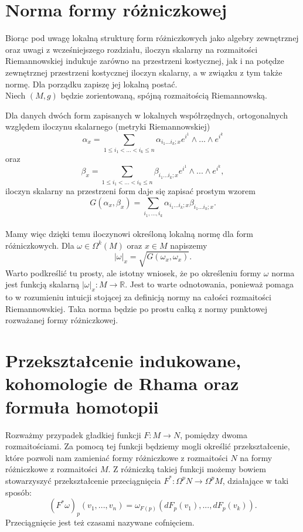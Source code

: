 \documentclass[licencjacka]{pracamgr}
\theoremstyle{definition}
\theoremstyle{definition}
\theoremstyle{plain}
\theoremstyle{plain}
\theoremstyle{plain}
\theoremstyle{plain}
\begin{document}
\section{Norma formy różniczkowej}
Biorąc pod uwagę lokalną strukturę form różniczkowych jako algebry zewnętrznej
oraz uwagi z wcześniejszego rozdziału, iloczyn skalarny na rozmaitości
Riemannowskiej indukuje zarówno na przestrzeni kostycznej, jak i na 
potędze zewnętrznej przestrzeni kostycznej iloczyn skalarny, a w związku
z tym także normę. Dla porządku zapiszę jej lokalną postać. \\

Niech $(M, g)$ będzie zorientowaną, spójną 
rozmaitością Riemannowską.


Dla danych dwóch form zapisanych w lokalnych współrzędnych, ortogonalnych
względem iloczynu skalarnego (metryki Riemannowskiej)
\[
\alpha_x = \sum_{1 \leq i_1 < ... < i_k \leq n} \alpha_{i_1 ... i_k; x} e^{i^1}
\wedge ...  \wedge e^{i^k}
\]
 oraz
\[ \beta_x = \sum_{1 \leq i_1 < ... < i_k \leq n} \beta_{i_1 ... i_k; x} e^{i^1}
\wedge ...  \wedge e^{i^k},
\]
iloczyn skalarny na przestrzeni form daje się zapisać prostym wzorem
\[
    G(\alpha_x, \beta_x) = \sum_{i_1, ..., i_k} \alpha_{i_1 ... i_k; x}
                                                    \beta_{i_1 ... i_k; x}.
\] \\


Mamy więc dzięki temu iloczynowi określoną lokalną normę dla form różniczkowych.
Dla $\omega \in \Omega^k(M)$ oraz $x \in M$ napiszemy
\[
    |\omega|_x = \sqrt{ G(\omega_x, \omega_x) }.
\]
Warto podkreślić tu prosty, ale istotny wniosek, że po określeniu formy $\omega$
norma jest funkcją skalarną $| \omega |_x : M \rightarrow \mathbb{R} $. Jest to warte
odnotowania, ponieważ pomaga to w rozumieniu intuicji stojącej za definicją normy
na całości rozmaitości Riemannowskiej. Taka norma będzie po prostu całką 
z normy punktowej rozważanej formy różniczkowej. \\


\section{Przekształcenie indukowane, kohomologie de Rhama oraz formuła homotopii}
Rozważmy przypadek gładkiej funkcji $F: M \rightarrow N$, pomiędzy
dwoma rozmaitościami. Za pomocą tej
funkcji będziemy mogli określić przekształcenie, które pozwoli nam
zamieniać formy różniczkowe z rozmaitości $N$ na formy różniczkowe z
rozmaitości $M$. Z różniczką takiej funkcji możemy bowiem stowarzyszyć
przekształcenie
przeciągnięcia $F^\ast: \Omega^p N \rightarrow \Omega^p M$, działające w taki sposób:
\[
    (F^\ast \omega)_p(v_1, ..., v_n) =
        \omega_{F(p)}(dF_p(v_1), ..., dF_p(v_k)).
\] Przeciągnięcie jest też czasami nazywane cofnięciem. \\
\end{document}
